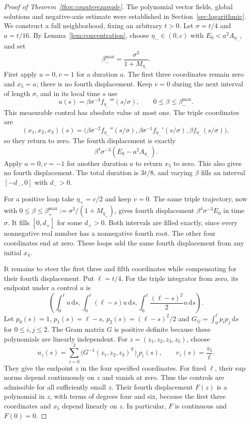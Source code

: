 \documentclass[11pt,a4paper]{article}
\newcommand{\dd}{\,\mathrm{d}}
\begin{document}
\begin{proof}[Proof of Theorem~\ref{thm:counterexample}]
The polynomial vector fields, global solutions and negative-axis estimate
were established in Section~\ref{sec:logarithmic}. We construct a full
neighborhood, fixing an arbitrary $t>0$.
Let $\sigma=t/4$ and $a=t/16$. By
Lemma~\ref{lem:concentration}, choose $\eta_-\in(0,c)$ with
$E_0<a^2A_{\eta_-}$, and set
\[
 \beta_-^{\max}=\frac{\sigma^3}{1+M_{\eta_-}}.
\]
First apply $u=0,v=1$ for a duration $a$.
The first three coordinates remain zero and $x_5=a$; there is no fourth
displacement. Keep $v=0$ during the next interval of length $\sigma$, and
in its local time $s$ use
\[
 u(s)=\beta\sigma^{-3}f_{\eta_-}'''(s/\sigma),\qquad
 0\le\beta\le\beta_-^{\max}.
\]
This measurable control has absolute value at most one. The triple
coordinates are
\[
 (x_1,x_2,x_3)(s)
 =\bigl(\beta\sigma^{-2}f_{\eta_-}''(s/\sigma),
        \beta\sigma^{-1}f_{\eta_-}'(s/\sigma),
        \beta f_{\eta_-}(s/\sigma)\bigr),
\]
so they return to zero. The fourth displacement is exactly
\begin{equation}\label{eq:negative-loop}
 \beta^4\sigma^{-3}(E_0-a^2A_{\eta_-}).
\end{equation}
Apply $u=0,v=-1$ for another duration $a$ to return $x_5$ to zero.
This also gives no fourth displacement. The total duration is $3t/8$,
and varying $\beta$ fills an interval $[-d_-,0]$ with $d_->0$.

For a positive loop take $\eta_+=c/2$ and keep $v=0$.
The same triple trajectory, now with
$0\le\beta\le\beta_+^{\max}:=\sigma^3/(1+M_{\eta_+})$, gives fourth
displacement $\beta^4\sigma^{-3}E_0$ in time $\sigma$.
It fills $[0,d_+]$ for some $d_+>0$.
Both intervals are filled exactly, since every nonnegative real number has
a nonnegative fourth root. The other four coordinates end at zero.
These loops add the same fourth displacement from any initial $x_4$.

It remains to steer the first three and fifth coordinates while compensating
for their fourth displacement. Put $\ell=t/4$.
For the triple integrator from zero, its endpoint under a control $u$ is
\begin{equation}\label{eq:linear-endpoint}
 \left(\int_0^\ell u\dd s,
       \int_0^\ell(\ell-s)u\dd s,
       \int_0^\ell\frac{(\ell-s)^2}{2}u\dd s\right).
\end{equation}
Let $p_0(s)=1$, $p_1(s)=\ell-s$, $p_2(s)=(\ell-s)^2/2$ and
$G_{ij}=\int_0^\ell p_i p_j\dd s$ for $0\le i,j\le2$.
The Gram matrix $G$ is positive definite because these polynomials are
linearly independent. For $z=(z_1,z_2,z_3,z_5)$, choose
\[
 u_z(s)=\sum_{i=0}^2\bigl(G^{-1}(z_1,z_2,z_3)^\mathsf{T}\bigr)_i p_i(s),
 \qquad v_z(s)=\frac{z_5}{\ell}.
\]
They give the endpoint $z$ in the four specified coordinates.
For fixed $\ell$, their sup norms depend continuously on $z$ and vanish
at zero. Thus the controls are admissible for all sufficiently small $z$.
Their fourth displacement $F(z)$ is a polynomial in $z$, with terms of
degrees four and six, because the first three coordinates and $x_5$ depend
linearly on $z$. In particular, $F$ is continuous and $F(0)=0$.


\end{proof}
\end{document}
